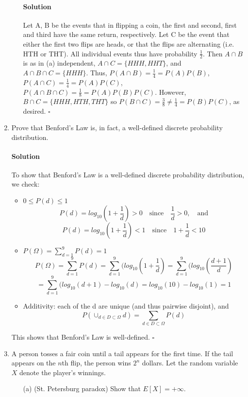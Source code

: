 \documentclass[letterpaper,12pt]{article}
\theoremstyle{definition}
\begin{document}
\begin{enumerate}
\begin{itemize}
        \paragraph{Solution} Let A, B be the events  that  in flipping a coin, the first and second, first and third have the same return, respectively. Let C be the event that either the first two  flips are heads, or that the flips are alternating (i.e. HTH or THT). All individual events thus have probability $\frac{1}{2}$. Then  $A \cap B$ is as in (a) independent,  $A \cap C = \{HHH, HHT\}$, and $A  \cap B \cap C = \{HHH\}$.  Thus, $P(A  \cap B) = \frac{1}{4} = P(A)P(B)$, $P(A  \cap C) = \frac{1}{4} = P(A)P(C)$, $P(A  \cap B \cap C) = \frac{1}{8} = P(A)P(B)P(C)$. However, $B \cap C = \{HHH, HTH, THT\}$ so $P(B  \cap C) = \frac{3}{8} \neq \frac{1}{4} = P(B)P(C)$, as desired. $\square$
        
        
		\end{itemize}
   	\item Prove that Benford's Law is, in fact, a well-defined discrete probability distribution.
    \paragraph{Solution} To show that Benford's Law is a well-defined discrete probability distribution, we check:
    \begin{itemize}
    \item $0 \le P(d) \le 1$ $$P(d) = log_{10}(1 + \frac{1}{d}) > 0 \quad \text{since} \quad \frac{1}{d} > 0, \quad \text{and} $$
    $$ P(d) = log_{10}(1 + \frac{1}{d}) < 1 \quad \text{since} \quad 1 +\frac{1}{d} < 10 $$ 
    \item $P(\Omega) = \sum_{d = 1}^9 P(d) = 1$
    $$P(\Omega) = \sum_{d = 1}^9 P(d) = \sum_{d = 1}^9(log_{10}(1 + \frac{1}{d}) = \sum_{d = 1}^9(log_{10}(\frac{d + 1}{d}) $$ 
    $$= \sum_{d = 1}^9(log_{10}(d + 1) - log_{10}(d) = log_{10}(10) - log_{10}(1) = 1 $$
    \item Additivity: each of the d are unique (and thus pairwise  disjoint),  and
    $$P(\cup_{d \in D \subset \Omega}d) = \sum_{d \in D \subset \Omega}P(d)$$
    \end{itemize}
    This shows that Benford's Law is well-defined. $\square$
    
   	\item A person tosses a fair coin until a tail appears for the first time. If the tail appears on the $n$th flip, the person wins $2^n$ dollars. Let the random variable $X$ denote the player's winnings.
		\begin{itemize}
			\item[(a)] (St. Petersburg paradox) Show that $E[X]= + \infty$.

\end{itemize}
\end{enumerate}
\end{document}
